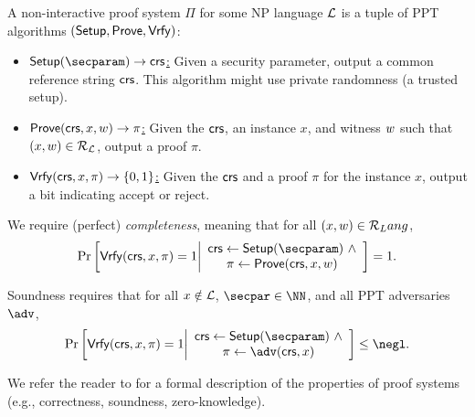 \begin{definition} A non-interactive proof system $\Pi$ for some NP language $\mathcal{L}$ is a tuple of PPT algorithms $(\mathsf{Setup}, \mathsf{Prove}, \mathsf{Vrfy})$:
    \begin{itemize}
        \item \underline{$\setup(\secparam) \rightarrow \crs$:} Given a security parameter, output a common reference string $\mathsf{crs}$. This algorithm might use private randomness (a trusted setup).
        \item \underline{$\mathsf{Prove}(\mathsf{crs}, x, w) \rightarrow \pi$:} Given the $\mathsf{crs}$, an instance $x$, and witness $w$ such that $(x, w) \in \mathcal{R}_{\mathcal{L}}$, output a proof $\pi$.
        \item \underline{$\mathsf{Vrfy}(\mathsf{crs}, x,\pi) \rightarrow \{0,1\}$:} Given the $\mathsf{crs}$ and a proof $\pi$ for the instance $x$, output a bit indicating accept or reject.
    \end{itemize}

We require (perfect) \emph{completeness}, meaning that for all $(x,w) \in \mathcal{R}_Lang$,
\begin{equation*}
    \Pr\left[
        \vrfy(\crs, x, \pi)=1 
        \middle| 
        \begin{array}{c}
            \crs \gets \setup(\secparam)~\land\\
            \pi \gets \prove(\crs, x, \witness)
        \end{array}
    \right] = 1.
\end{equation*}
\end{definition}

\begin{definition}[soundness] Soundness requires that for all $x \notin \mathcal{L}$, $\secpar \in \NN$, and all PPT adversaries $\adv$,
\begin{equation*}
    \Pr\left[
        \vrfy(\crs, x, \pi)=1 
        \middle| 
        \begin{array}{c}
            \crs \gets \setup(\secparam)~\land\\
            \pi \gets \adv(\crs, x)
        \end{array}
    \right] \leq \negl.
\end{equation*}
\end{definition}

We refer the reader to \cite{Thaler23,goldreich_book} for a formal description of the properties of proof systems (e.g., correctness, soundness, zero-knowledge). 

